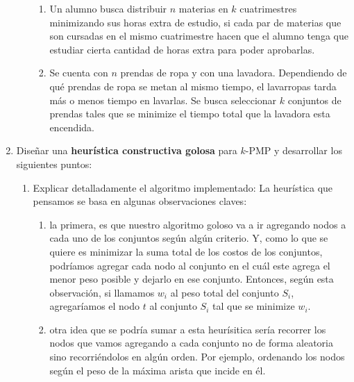 \documentclass[11pt, a4paper, twoside]{article}
\begin{document}
\begin{enumerate}
\begin{enumerate}
\begin{enumerate}
				\item Un alumno busca distribuir $n$ materias en $k$ cuatrimestres minimizando
				sus horas extra de estudio, si cada par de materias que son cursadas en el mismo
				cuatrimestre hacen que el alumno tenga que estudiar cierta cantidad de horas extra
				para poder aprobarlas.
				
				\item Se cuenta con $n$ prendas de ropa y con una lavadora. Dependiendo de qué prendas
				de ropa se metan al mismo tiempo, el lavarropas tarda más o menos tiempo en lavarlas. Se busca 
				seleccionar $k$ conjuntos de prendas tales que se minimize el tiempo total que la 
				lavadora esta encendida.
			  \end{enumerate}
    \end{enumerate}
    
    \newpage
    \item Diseñar una \textbf{heurística constructiva golosa} para $k$-PMP y desarrollar los siguientes
    puntos:
    \begin{enumerate}
    
		\item Explicar detalladamente el algoritmo implementado:
		La heurística que pensamos se basa en algunas observaciones claves: 
		\begin{enumerate}
			\item la primera, es que nuestro
			algoritmo goloso va a ir agregando nodos a cada uno de los conjuntos según algún criterio. Y,
			como lo que se quiere es minimizar la suma total de los costos de los conjuntos, podríamos agregar
			cada nodo al conjunto en el cuál este agrega el menor peso posible y dejarlo en ese conjunto. 
			Entonces, según esta observación,
			si llamamos $w_{i}$ al peso total del conjunto $S_{i}$, 
			agregaríamos el nodo $t$ al conjunto $S_{i}$ tal que se minimize $w_{i}$.
						
			\item otra idea que se podría sumar a esta heurísitica sería recorrer los nodos que vamos agregando a
			cada conjunto no de forma aleatoria sino recorriéndolos en algún orden. Por ejemplo, ordenando los nodos
			según el peso de la máxima arista que incide en él.
			
		\end{enumerate}
		

\end{enumerate}
\end{enumerate}
\end{document}
